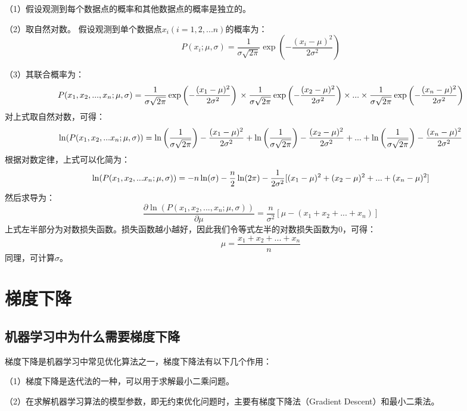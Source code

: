 （1）假设观测到每个数据点的概率和其他数据点的概率是独立的。

（2）取自然对数。 假设观测到单个数据点$x_i(i=1,2,...n)$的概率为： \[
P(x_i;\mu,\sigma)=\frac{1}{\sigma \sqrt{2\pi}}\exp 
        \left( - \frac{(x_i-\mu)^2}{2\sigma^2} \right)
\]

（3）其联合概率为： \[
P(x_1,x_2,...,x_n;\mu,\sigma)=\frac{1}{\sigma \sqrt{2\pi}}\exp 
        \left( - \frac{(x_1-\mu)^2}{2\sigma^2} \right) \\ \times
         \frac{1}{\sigma \sqrt{2\pi}}\exp 
        \left( - \frac{(x_2-\mu)^2}{2\sigma^2} \right) \times ... \times
        \frac{1}{\sigma \sqrt{2\pi}}\exp 
        \left( - \frac{(x_n-\mu)^2}{2\sigma^2} \right)
\] ​ 对上式取自然对数，可得： \[
 \ln(P(x_1,x_2,...x_n;\mu,\sigma))=
        \ln \left(\frac{1}{\sigma \sqrt{2\pi}} \right) 
         - \frac{(x_1-\mu)^2}{2\sigma^2}  \\ +
         \ln \left( \frac{1}{\sigma \sqrt{2\pi}} \right) 
         - \frac{(x_2-\mu)^2}{2\sigma^2} +...+
         \ln \left( \frac{1}{\sigma \sqrt{2\pi}} \right) 
         - \frac{(x_n-\mu)^2}{2\sigma^2}
\] 根据对数定律，上式可以化简为： \[
\ln(P(x_1,x_2,...x_n;\mu,\sigma))=-n\ln(\sigma)-\frac{n}{2} \ln(2\pi)\\
        -\frac{1}{2\sigma^2}[(x_1-\mu)^2+(x_2-\mu)^2+...+(x_n-\mu)^2]
\] 然后求导为： \[
\frac{\partial\ln(P(x_1,x_2,...,x_n;\mu,\sigma))}{\partial\mu}=
                \frac{n}{\sigma^2}[\mu - (x_1+x_2+...+x_n)]
\] ​
上式左半部分为对数损失函数。损失函数越小越好，因此我们令等式左半的对数损失函数为0，可得：
\[
\mu=\frac{x_1+x_2+...+x_n}{n}
\] 同理，可计算$\sigma ​$。

\section{ 梯度下降}\label{ux68afux5ea6ux4e0bux964d}

\subsection{机器学习中为什么需要梯度下降}\label{ux673aux5668ux5b66ux4e60ux4e2dux4e3aux4ec0ux4e48ux9700ux8981ux68afux5ea6ux4e0bux964d}

梯度下降是机器学习中常见优化算法之一，梯度下降法有以下几个作用：

（1）梯度下降是迭代法的一种，可以用于求解最小二乘问题。

（2）在求解机器学习算法的模型参数，即无约束优化问题时，主要有梯度下降法（Gradient
Descent）和最小二乘法。

